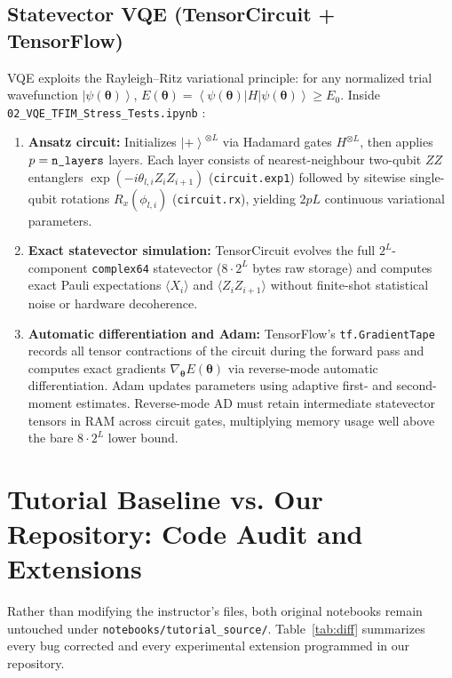 \documentclass[11pt,a4paper]{article}
\providecommand{\ket}[1]{\left|#1\right\rangle}
\providecommand{\bra}[1]{\left\langle#1\right|}
\begin{document}
\subsection{Statevector VQE (TensorCircuit + TensorFlow)}
VQE exploits the Rayleigh--Ritz variational principle: for any normalized trial wavefunction $\ket{\psi(\boldsymbol{\theta})}$, $E(\boldsymbol{\theta}) = \bra{\psi(\boldsymbol{\theta})} H \ket{\psi(\boldsymbol{\theta})} \ge E_0$. Inside \texttt{02\_VQE\_TFIM\_Stress\_Tests.ipynb} \cite{TensorCircuitVQE}:
\begin{enumerate}[leftmargin=*]
\item \textbf{Ansatz circuit:} Initializes $\ket{+}^{\otimes L}$ via Hadamard gates $H^{\otimes L}$, then applies $p = \text{\texttt{n\_layers}}$ layers. Each layer consists of nearest-neighbour two-qubit $ZZ$ entanglers $\exp(-i\theta_{l,i} Z_i Z_{i+1})$ (\texttt{circuit.exp1}) followed by sitewise single-qubit rotations $R_x(\phi_{l,i})$ (\texttt{circuit.rx}), yielding $2 p L$ continuous variational parameters.
\item \textbf{Exact statevector simulation:} TensorCircuit evolves the full $2^L$-component \texttt{complex64} statevector ($8 \cdot 2^L$ bytes raw storage) and computes exact Pauli expectations $\langle X_i \rangle$ and $\langle Z_i Z_{i+1} \rangle$ without finite-shot statistical noise or hardware decoherence.
\item \textbf{Automatic differentiation and Adam:} TensorFlow's \texttt{tf.GradientTape} records all tensor contractions of the circuit during the forward pass and computes exact gradients $\nabla_{\boldsymbol{\theta}} E(\boldsymbol{\theta})$ via reverse-mode automatic differentiation. Adam updates parameters using adaptive first- and second-moment estimates. Reverse-mode AD must retain intermediate statevector tensors in RAM across circuit gates, multiplying memory usage well above the bare $8\cdot 2^L$ lower bound.
\end{enumerate}

\section{Tutorial Baseline vs. Our Repository: Code Audit and Extensions}
Rather than modifying the instructor's files, both original notebooks remain untouched under \texttt{notebooks/tutorial\_source/}. Table~\ref{tab:diff} summarizes every bug corrected and every experimental extension programmed in our repository.
\end{document}
